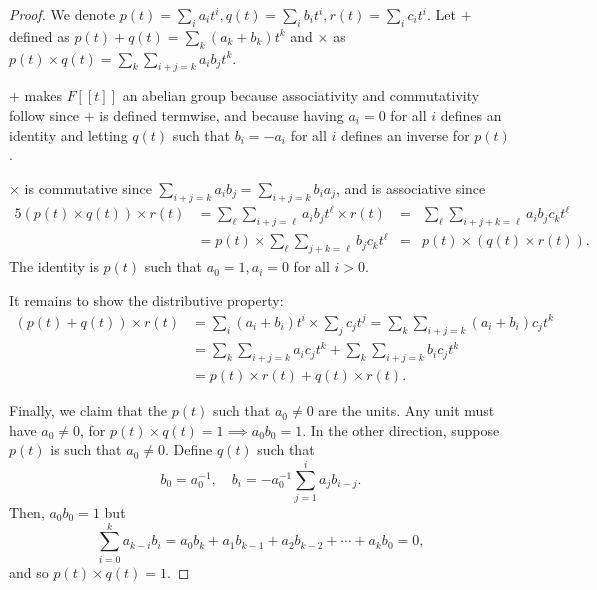 \documentclass[12pt]{article}
\theoremstyle{remark}
\begin{document}
\begin{proof}
  We denote $p(t) = \sum_i a_it^i,q(t) = \sum_i b_it^i,r(t) = \sum_i c_it^i$. Let $+$ defined as $p(t) + q(t) = \sum_k (a_k + b_k)t^k$ and $\times$ as $p(t) \times q(t) = \sum_k \sum_{i+j=k} a_ib_jt^k$.
  \par $+$ makes $F[[t]]$ an abelian group because associativity and commutativity follow since $+$ is defined termwise, and because having $a_i = 0$ for all $i$ defines an identity and letting $q(t)$ such that $b_i = -a_i$ for all $i$ defines an inverse for $p(t)$.
  \par $\times$ is commutative since $\sum_{i+j=k} a_ib_j = \sum_{i+j=k} b_ia_j$, and is associative since
  \begin{alignat*}{5}
    (p(t) \times q(t)) \times r(t) &= \sum_\ell\sum_{i+j=\ell}a_ib_jt^\ell \times r(t) &={}& \sum_\ell\sum_{i+j+k=\ell}a_ib_jc_kt^\ell\\
    &= p(t) \times \sum_\ell\sum_{j+k=\ell}b_jc_kt^\ell &={}& p(t) \times (q(t) \times r(t)).
  \end{alignat*}
  The identity is $p(t)$ such that $a_0 = 1,a_i = 0$ for all $i > 0$.
  \par It remains to show the distributive property:
  \begin{align*}
    (p(t) + q(t)) \times r(t) &= \sum_i (a_i + b_i)t^i \times \sum_j c_jt^j = \sum_k\sum_{i+j=k} (a_i+b_i)c_jt^k\\
    &= \sum_k\sum_{i+j=k} a_ic_jt^k + \sum_k\sum_{i+j=k} b_ic_jt^k\\
    &= p(t) \times r(t) + q(t) \times r(t).
  \end{align*}
  \par Finally, we claim that the $p(t)$ such that $a_0 \ne 0$ are the units. Any unit must have $a_0 \ne 0$, for $p(t) \times q(t) = 1 \implies a_0b_0 = 1$. In the other direction, suppose $p(t)$ is such that $a_0 \ne 0$. Define $q(t)$ such that
  \begin{equation*}
    b_0 = a_0^{-1}, \quad b_i = -a_0^{-1}\sum_{j=1}^i a_jb_{i-j}.
  \end{equation*}
  Then, $a_0b_0 = 1$ but
  \begin{equation*}
    \sum_{i=0}^k a_{k-i}b_{i} = a_0b_k + a_1b_{k-1} + a_2b_{k-2} + \cdots + a_kb_0 = 0,
  \end{equation*}
  and so $p(t) \times q(t) = 1$.
\end{proof}
\end{document}
